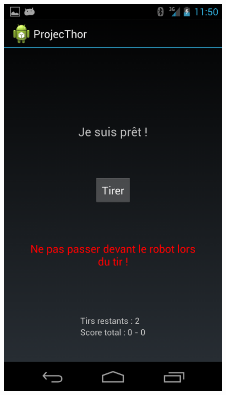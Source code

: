 \begin{figure}
\begin{minipage}{0.45\textwidth}
		\center
		\includegraphics[scale=0.2]{view_5.png}
	\end{minipage}

	\vspace*{20mm}


\end{figure}
